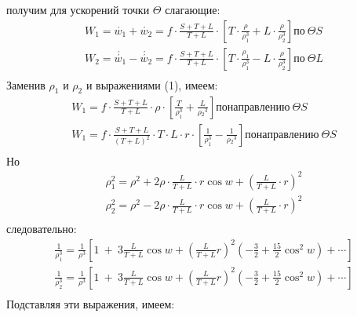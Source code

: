 \documentclass[a4paper,12pt]{article}
\begin{document}
получим для ускорений точки $\Theta$ слагающие:
\begin{equation*}
    \begin{aligned}
        W_1 = \acute{w_1} + \acute{w_2} = f\cdot\frac{S + T + L}{T + L}\cdot \left[T\cdot \frac{\rho}{\rho_{1}^3} + L\cdot\frac{\rho}{\rho_{2}^3}\right] по\:\Theta S\\
        W_2 = \acute{\acute{w_1}} - \acute{\acute{w_2}} = f\cdot\frac{S + T + L}{T + L}\cdot \left[T\cdot \frac{\rho_1}{\rho_{1}^3} - L\cdot\frac{\rho}{\rho_{2}^3}\right] по\: \Theta L\\
    \end{aligned}
\end{equation*}
Заменив $\rho_1$ и $\rho_2$ и выражениями (1), имеем:
\begin{equation*}
    \begin{aligned}
        W_1 = f\cdot\frac{S + T + L}{T + L}\cdot{\rho}\cdot\left[\frac{T}{\rho_{1}^3} + \frac{L}{\rho{_2}^3} \right] по направлению\: \Theta S \\
         W_1 = f\cdot\frac{S + T + L}{(T + L)^2}\cdot T \cdot L \cdot r \cdot\left[\frac{1}{\rho_{1}^3} - \frac{1}{\rho{_2}^3} \right] по направлению\: \Theta S \\
    \end{aligned}
\end{equation*}
Но
\begin{equation*}
    \begin{aligned}
        \rho_1^2 = \rho^2 + 2\rho\cdot\frac{L}{T + L}\cdot r \cos w + \left(\frac{L}{T + L}\cdot r\right)^2 \\
        \rho_2^2 = \rho^2 - 2\rho\cdot\frac{L}{T + L}\cdot r \cos w + \left(\frac{L}{T + L}\cdot r\right)^2 \\
    \end{aligned}
\end{equation*}
следовательно:
\begin{equation*}
    \begin{aligned}
    \frac{1}{\rho_1^3} = \frac{1}{\rho^3}\left[1\:+\:3\frac{L}{T + L}\cos w +\left(\frac{L}{T + L}r\right)^2\left(-\frac{3}{2}+\frac{15}{2}\cos^2 w\right)+\cdots\right]\\
    \frac{1}{\rho_2^3} = \frac{1}{\rho^3}\left[1\:+\:3\frac{L}{T + L}\cos w +\left(\frac{L}{T + L}r\right)^2\left(-\frac{3}{2}+\frac{15}{2}\cos^2 w\right)+\cdots\right]\\
    \end{aligned}
\end{equation*}
Подставляя эти выражения, имеем:
\end{document}
